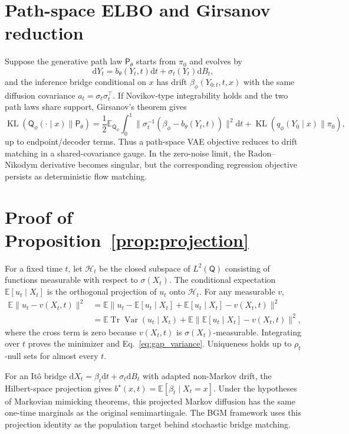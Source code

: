\documentclass{article}
\numberwithin{equation}{section}
\newcommand{\KL}{\operatorname{KL}}
\newcommand{\E}{\mathbb{E}}
\newcommand{\dd}{\mathrm{d}}
\newcommand{\pbase}{\pi_0}
\newcommand{\scrP}{\mathsf{P}}
\newcommand{\scrQ}{\mathsf{Q}}
\newcommand{\Var}{\operatorname{Var}}
\newcommand{\Tr}{\operatorname{Tr}}
\begin{document}
\section{Path-space ELBO and Girsanov reduction}
\label{app:elbo}

Suppose the generative path law $\scrP_\theta$ starts from $\pbase$ and evolves by
\begin{equation}
\dd Y_t=b_\theta(Y_t,t)\dd t+\sigma_t(Y_t)\dd B_t,
\end{equation}
and the inference bridge conditional on $x$ has drift $\beta_\phi(Y_{0:t},t,x)$ with the same diffusion covariance $a_t=\sigma_t\sigma_t^\top$. If Novikov-type integrability holds and the two path laws share support, Girsanov's theorem gives
\begin{equation}
\KL(\scrQ_\phi(\cdot\mid x)\|\scrP_\theta)
=\frac12\E_{\scrQ_\phi}\int_0^1
\|\sigma_t^{-1}(\beta_\phi-b_\theta(Y_t,t))\|^2\dd t
+\KL(q_\phi(Y_0\mid x)\|\pbase),
\end{equation}
up to endpoint/decoder terms. Thus a path-space VAE objective reduces to drift matching in a shared-covariance gauge. In the zero-noise limit, the Radon--Nikodym derivative becomes singular, but the corresponding regression objective persists as deterministic flow matching.

\section{Proof of Proposition~\ref{prop:projection}}
\label{app:projection}

For a fixed time $t$, let $\mathcal H_t$ be the closed subspace of $L^2(\scrQ)$ consisting of functions measurable with respect to $\sigma(X_t)$. The conditional expectation $\E[u_t\mid X_t]$ is the orthogonal projection of $u_t$ onto $\mathcal H_t$. For any measurable $v$,
\begin{align}
\E\|u_t-v(X_t,t)\|^2
&=\E\|u_t-\E[u_t\mid X_t]+\E[u_t\mid X_t]-v(X_t,t)\|^2\\
&=\E\Tr\Var(u_t\mid X_t)+\E\|\E[u_t\mid X_t]-v(X_t,t)\|^2,
\end{align}
where the cross term is zero because $v(X_t,t)$ is $\sigma(X_t)$-measurable. Integrating over $t$ proves the minimizer and Eq.~\eqref{eq:gap_variance}. Uniqueness holds up to $\rho_t$-null sets for almost every $t$.

For an It\^o bridge $\dd X_t=\beta_t\dd t+\sigma_t\dd B_t$ with adapted non-Markov drift, the Hilbert-space projection gives $b^\star(x,t)=\E[\beta_t\mid X_t=x]$. Under the hypotheses of Markovian mimicking theorems, this projected Markov diffusion has the same one-time marginals as the original semimartingale. The BGM framework uses this projection identity as the population target behind stochastic bridge matching.
\end{document}

